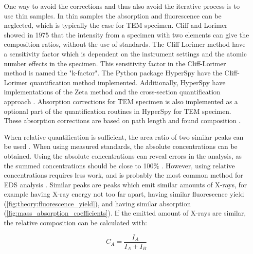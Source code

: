 One way to avoid the corrections and thus also avoid the iterative process is to use thin samples.
In thin samples the absorption and fluorescence can be neglected, which is typically the case for TEM specimen.
Cliff and Lorimer \cite{CL1975} showed in 1975 that the intensity from a specimen with two elements can give the composition ratios, without the use of standards.
The Cliff-Lorimer method have a sensitivity factor which is dependent on the instrument settings and the atomic number effects in the specimen.
This sensitivity factor in the Cliff-Lorimer method is named the "k-factor".
The Python package HyperSpy have the Cliff-Lorimer quantification method implemented.
Additionally, HyperSpy have implementations of the Zeta method \cite{watanabe_williams_zeta_2006} and the cross-section quantification approach \cite{MacArthur}.
Absorption corrections for TEM specimen is also implemented as a optional part of the quantification routines in HyperSpy for TEM specimen.
These absorption corrections are based on path length and found composition \cite{williams_carter_tem_2009}.



When relative quantification is sufficient, the area ratio of two similar peaks can be used \cite{goldstein_scanning_2018}.
When using measured standards, the absolute concentrations can be obtained.
Using the absolute concentrations can reveal errors in the analysis, as the summed concentrations should be close to 100\% \cite{goldstein_scanning_2018}.
However, using relative concentrations requires less work, and is probably the most common method for EDS analysis .
Similar peaks are peaks which emit similar amounts of X-rays, for example having X-ray energy not too far apart, having similar fluorescence yield (\cref{fig:theory:fluorescence_yield}), and having similar absorption (\cref{fig:mass_absorption_coefficients}).
If the emitted amount of X-rays are similar, the relative composition can be calculated with:

\begin{equation}
    \label{eq:theory:quantitative:area_ratio}
    C_A = \frac{I_A}{I_A + I_B}
\end{equation}

